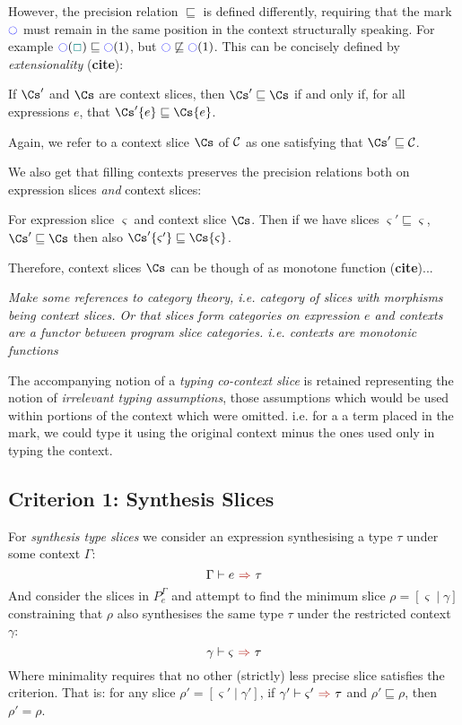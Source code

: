 However, the precision relation $\sqsubseteq$ is defined differently, requiring that the mark $\mark$ must remain in the same position in the context structurally speaking. For example $\mark(\gap) \sqsubseteq \mark(1)$, but $\mark \not \sqsubseteq \mark(1)$. This can be concisely defined by \textit{extensionality} (\textbf{cite}):

\begin{definition}\label{def:ContextPrecision}
If $\Cs'$ and $\Cs$ are context slices, then $\Cs' \sqsubseteq \Cs$ if and only if, for all expressions $e$, that $\Cs'\{e\} \sqsubseteq \Cs\{e\}$.
\end{definition}
Again, we refer to a context slice $\Cs$ of $\mathcal{C}$ as one satisfying that $\Cs' \sqsubseteq \C$.

We also get that filling contexts preserves the precision relations both on expression slices \textit{and} context slices:
\begin{conjecture}
For expression slice $\varsigma$ and context slice $\Cs$. Then if we have slices $\varsigma' \sqsubseteq \varsigma$, $\Cs' \sqsubseteq \Cs$ then also $\Cs'\{\varsigma'\} \sqsubseteq \Cs\{\varsigma\}$.
\end{conjecture}
Therefore, context slices $\Cs$ can be though of as monotone function (\textbf{cite})...

\textit{Make some references to category theory, i.e. category of slices with morphisms being context slices. Or that slices form categories on expression $e$ and contexts are a functor between program slice categories. i.e. contexts are monotonic functions}

The accompanying notion of a \textit{typing co-context slice} is retained representing the notion of \textit{irrelevant typing assumptions}, those assumptions which would be used within portions of the context which were omitted. i.e. for a a term placed in the mark, we could type it using the original context minus the ones used only in typing the context.

\subsection{Criterion 1: Synthesis Slices}
\label{sec:SynthesisSlices}
For \textit{synthesis type slices} we consider an expression synthesising a type $\tau$ under some context $\Gamma$:
\[\synthesis{e}{\tau}\]
And consider the slices in $P_e^{\Gamma}$ and attempt to find the minimum slice $\rho = [\varsigma\mid \gamma]$ constraining that $\rho$ also synthesises the same type $\tau$ under the restricted context $\gamma$:
\[\synthesis[\gamma]{\varsigma}{\tau}\]
Where minimality requires that no other (strictly) less precise slice satisfies the criterion. That is: for any slice $\rho' = [\varsigma'\mid \gamma']$, if $\synthesis[\gamma']{\varsigma'}{\tau}$ and $\rho' \sqsubseteq \rho$, then $\rho' = \rho$.

